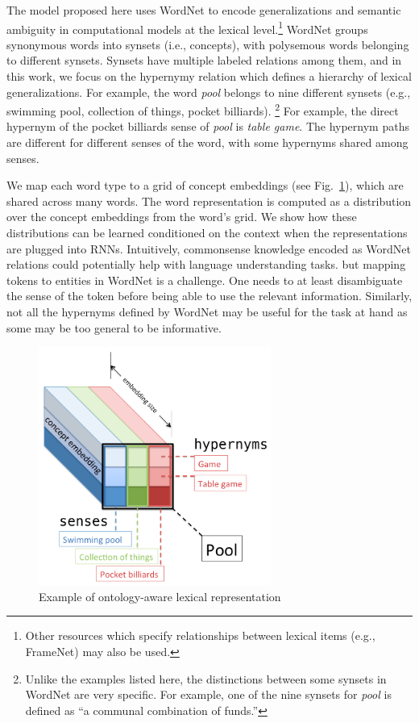 The model proposed here uses WordNet \citep{miller1995wordnet} to encode generalizations and semantic ambiguity in computational models at the lexical level.\footnote{Other resources which specify relationships between lexical items (e.g., FrameNet) may also be used.}
WordNet groups synonymous words into synsets (i.e., concepts), with polysemous words belonging to different synsets. Synsets have multiple labeled relations among them, and in this work, we focus on the hypernymy relation which defines a hierarchy of lexical generalizations.
For example, the word \textit{pool} belongs to nine different synsets (e.g., swimming pool, collection of things, pocket billiards).
\footnote{Unlike the examples listed here, the distinctions between some synsets in WordNet are very specific. For example, one of the nine synsets for \textit{pool} is defined as ``a communal combination of funds.''}
For example, the direct hypernym of the pocket billiards sense of \textit{pool} is \textit{table game}.
The hypernym paths are different for different senses of the word, with some hypernyms shared among senses.

We map each word type to a grid of concept embeddings (see Fig.~\ref{fig:ontolstm_tensor}), which are shared across many words. The word representation is computed as a distribution over the concept embeddings from the word's grid. We show how these distributions can be 
learned conditioned on the context when the representations are plugged into RNNs.
Intuitively, commonsense knowledge encoded as WordNet relations could potentially help with language understanding tasks. 
but mapping tokens to entities in WordNet is a challenge. One needs to at least disambiguate the sense of the token before being able to use the relevant information. Similarly, not all the hypernyms defined by WordNet may be useful for the task at hand as some may be too general to be informative.
 
\begin{figure}[t]
\begin{center}
\includegraphics[width=3in]{figures/tensor2.png}
\caption{Example of ontology-aware lexical representation}
\label{fig:ontolstm_tensor}
\end{center}
\end{figure}

